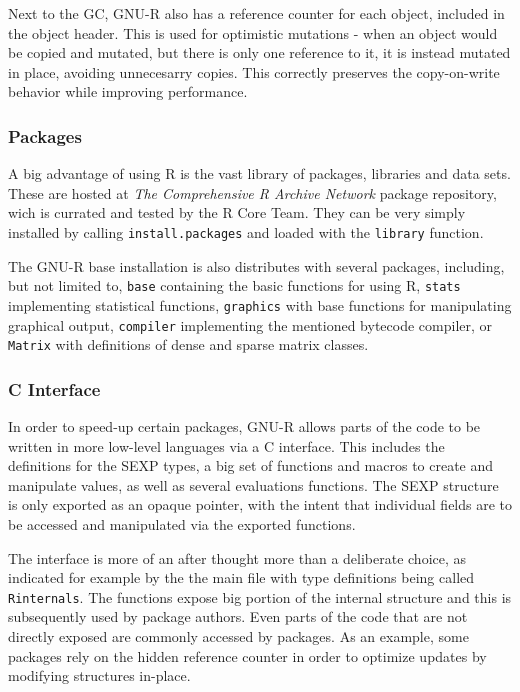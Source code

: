 Next to the GC, GNU-R also has a reference counter for each object, included in the object header. This is used for optimistic mutations - when an object would be copied and mutated, but there is only one reference to it, it is instead mutated in place, avoiding unnecesarry copies. This correctly preserves the copy-on-write behavior while improving performance.

\subsubsection*{Packages}

A big advantage of using R is the vast library of packages, libraries and data sets. These are hosted at \textit{The Comprehensive R Archive Network}\cite{cran} package repository, wich is currated and tested by the R Core Team. They can be very simply installed by calling \texttt{install.packages} and loaded with the \texttt{library} function.

The GNU-R base installation is also distributes with several packages, including, but not limited to, \texttt{base} containing the basic functions for using R, \texttt{stats} implementing statistical functions, \texttt{graphics} with base functions for manipulating graphical output, \texttt{compiler} implementing the mentioned bytecode compiler, or \texttt{Matrix} with definitions of dense and sparse matrix classes.

\subsubsection*{C Interface}

In order to speed-up certain packages, GNU-R allows parts of the code to be written in more low-level languages via a C interface. This includes the definitions for the SEXP types, a big set of functions and macros to create and manipulate values, as well as several evaluations functions. The SEXP structure is only exported as an opaque pointer, with the intent that individual fields are to be accessed and manipulated via the exported functions.

The interface is more of an after thought more than a deliberate choice, as indicated for example by the the main file with type definitions being called \texttt{Rinternals}. The functions expose big portion of the internal structure and this is subsequently used by package authors. Even parts of the code that are not directly exposed are commonly accessed by packages. As an example, some packages rely on the hidden reference counter in order to optimize updates by modifying structures in-place.

